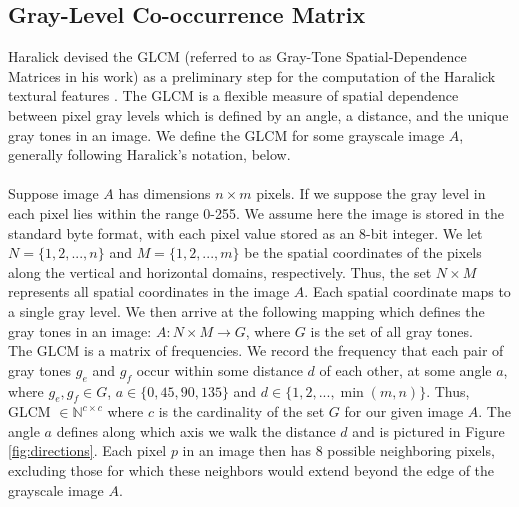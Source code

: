 \documentclass{article}
\begin{document}
\subsection{Gray-Level Co-occurrence Matrix}
    Haralick devised the GLCM (referred to as Gray-Tone Spatial-Dependence Matrices in his work) as a preliminary step for the computation of the Haralick textural features \cite{haralick}. The GLCM is a flexible measure of spatial dependence between pixel gray levels which is defined by an angle, a distance, and the unique gray tones in an image. We define the GLCM for some grayscale image $A$, generally following Haralick's notation, below. \\ \\
    Suppose image $A$ has dimensions $n \times m$ pixels. If we suppose the gray level in each pixel lies within the range 0-255. We assume here the image is stored in the standard byte format, with each pixel value stored as an 8-bit integer. We let $N = \{ 1, 2, ..., n\}$ and $M = \{1, 2, ..., m\}$ be the spatial coordinates of the pixels along the vertical and horizontal domains, respectively. Thus, the set $N \times M $ represents all spatial coordinates in the image $A$. Each spatial coordinate maps to a single gray level. We then arrive at the following mapping which defines the gray tones in an image: $ A:  N \times M \to G$, where $G$ is the set of all gray tones. \\
    The GLCM is a matrix of frequencies. We record the frequency that each pair of gray tones $g_e$ and $g_f$ occur within some distance $d$ of each other, at some angle $a$, where $g_e, g_f \in G$, $a \in \{0, 45, 90, 135\}$ and $d \in \{1, 2, ..., \min(m, n)\}$. Thus, GLCM $\in \mathbb{N}^{c \times c}$ where $c$ is the cardinality of the set $G$ for our given image $A$. The angle $a$ defines along which axis we walk the distance $d$ and is pictured in Figure \ref{fig:directions}. Each pixel $p$ in an image then has 8 possible neighboring pixels, excluding those for which these neighbors would extend beyond the edge of the grayscale image $A$. 
\end{document}
